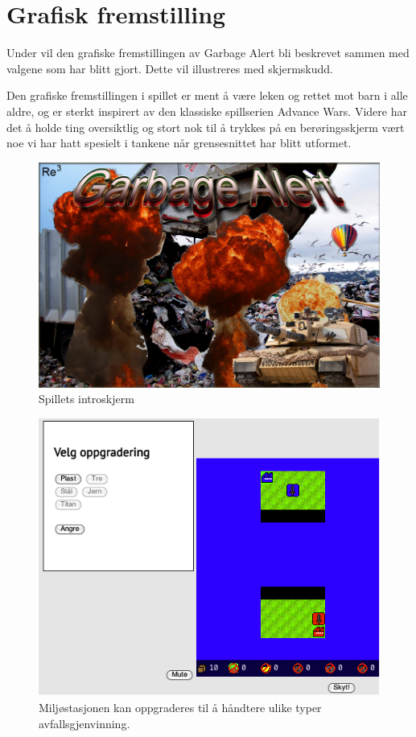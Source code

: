 \section{Grafisk fremstilling}\label{sec:artwork}
Under vil den grafiske fremstillingen av Garbage Alert bli beskrevet sammen med valgene som har blitt gjort. Dette vil illustreres med skjermskudd.

Den grafiske fremstillingen i spillet er ment å være leken og rettet mot barn i alle aldre, og er sterkt inspirert av den klassiske spillserien Advance Wars. Videre har det å holde ting oversiktlig og stort nok til å trykkes på en berøringsskjerm vært noe vi har hatt spesielt i tankene når grensesnittet har blitt utformet.


\begin{figure} [H]
\centering
\includegraphics[width=\textwidth]{images/splashscreen.png}
\caption{Spillets introskjerm}
\label{fig:splashscreen}
\end{figure}

\begin{figure} [H]
\centering
\includegraphics[width=\textwidth]{images/Oppgradering.png}
\caption{Miljøstasjonen kan oppgraderes til å håndtere ulike typer avfallsgjenvinning.}
\label{fig:Oppgradering}
\end{figure}

